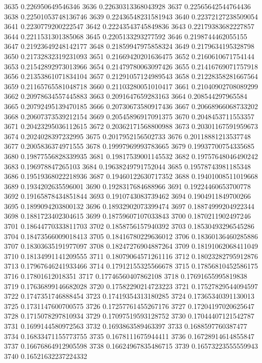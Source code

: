 3635 0.226950649546346
3636 0.22630313368043928
3637 0.22565642544764436
3638 0.22501053748136746
3639 0.22436548231581943
3640 0.22372127238509054
3641 0.2230779200222547
3642 0.22243543745849836
3643 0.22179383682227857
3644 0.2211531301385068
3645 0.2205133293277592
3646 0.2198744462055155
3647 0.21923649248142177
3648 0.21859947975858324
3649 0.2179634195328798
3650 0.21732832319231093
3651 0.21669420201636475
3652 0.2160610671754144
3653 0.21542892973013966
3654 0.21479780063097426
3655 0.21416769071757918
3656 0.21353861071834104
3657 0.21291057124989543
3658 0.21228358281667564
3659 0.21165765581048718
3660 0.21103280051010417
3661 0.21040902708089299
3662 0.20978634557445883
3663 0.2091647659283163
3664 0.208544297965584
3665 0.20792495139470185
3666 0.20730673580917436
3667 0.20668966068733202
3668 0.20607373539212154
3669 0.20545896917091375
3670 0.2048453711553357
3671 0.20423295036112615
3672 0.20362171568800988
3673 0.20301167591959673
3674 0.2024028397232995
3675 0.2017952156502733
3676 0.20118881213537748
3677 0.2005836374971555
3678 0.19997969993783665
3679 0.19937700754335685
3680 0.19877556828339935
3681 0.19817539001145532
3682 0.19757648046490242
3683 0.196978847265103
3684 0.19638249791752044
3685 0.19578743981185348
3686 0.19519368022218936
3687 0.19460122630717352
3688 0.19401008511019668
3689 0.1934202635596001
3690 0.1928317684688966
3691 0.19224460653700778
3692 0.19165878434851844
3693 0.1910743083739462
3694 0.1904911849700266
3695 0.1899094203800132
3696 0.18932902073399474
3697 0.18874999204922344
3698 0.1881723402304615
3699 0.18759607107033843
3700 0.1870211902497246
3701 0.18644770333811703
3702 0.1858756157940392
3703 0.18530493296545286
3704 0.18473566009018413
3705 0.18416780229636012
3706 0.18360136460285886
3707 0.18303635191977097
3708 0.18247276904887264
3709 0.18191062068411049
3710 0.18134991141209555
3711 0.18079064571261116
3712 0.18023282795912876
3713 0.17967646241933466
3714 0.17912155325566678
3715 0.17856810452586175
3716 0.17801612018351
3717 0.17746560407862108
3718 0.17691655995819838
3719 0.17636899146682028
3720 0.17582290214723223
3721 0.17527829544094597
3722 0.1747351746888454
3723 0.17419354313180285
3724 0.17365340391130013
3725 0.1731147600700575
3726 0.17257761455267176
3727 0.17204197020625647
3728 0.1715078297810934
3729 0.17097519593128752
3730 0.17044407121542787
3731 0.1699144580972563
3732 0.1693863589463397
3733 0.1688597760387477
3734 0.16833471155773755
3735 0.1678111675944411
3736 0.16728914614855847
3737 0.16676864912905598
3738 0.16624967835486715
3739 0.16573223555559943
3740 0.16521632237224332
